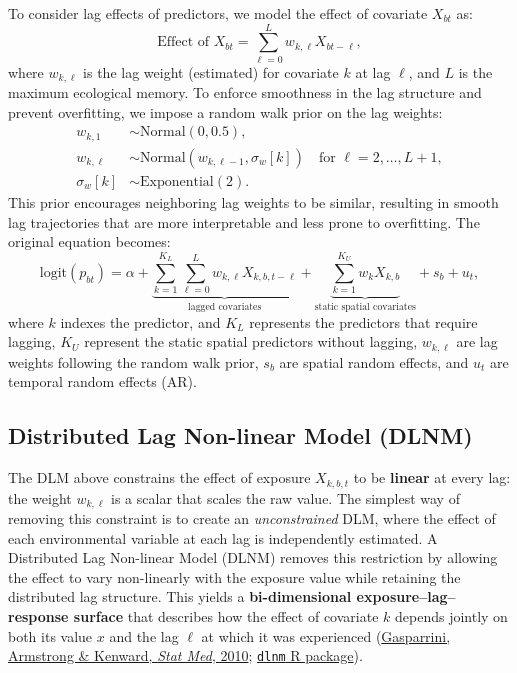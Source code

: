 \documentclass[12pt,a4paper]{article}
\begin{document}
To consider lag effects of predictors, we model the effect of covariate $X_{bt}$ as:
\begin{equation}
\text{Effect of } X_{bt} = \sum_{\ell=0}^{L} w_{k,\ell} X_{bt-\ell},
\end{equation}
where $w_{k,\ell}$ is the lag weight (estimated) for covariate $k$ at lag $\ell$, and $L$ is the maximum ecological memory. To enforce smoothness in the lag structure and prevent overfitting, we impose a random walk prior on the lag weights:
\begin{align}
w_{k,1} &\sim \text{Normal}(0, 0.5), \\
w_{k,\ell} &\sim \text{Normal}(w_{k,\ell-1}, \sigma_w[k]) \quad \text{for } \ell = 2, \ldots, L+1, \\
\sigma_w[k] &\sim \text{Exponential}(2).
\end{align}
This prior encourages neighboring lag weights to be similar, resulting in smooth lag trajectories that are more interpretable and less prone to overfitting. The original equation becomes:
\begin{equation}
\text{logit}(p_{bt}) = \alpha + \underbrace{\sum_{k=1}^{K_L} \sum_{\ell=0}^{L} w_{k,\ell} X_{k,b,t-\ell}}_{\text{lagged covariates}} +  \underbrace{\sum_{k=1}^{K_U} w_{k} X_{k,b}}_{\text{static spatial covariates}} + s_b + u_t,
\end{equation}
where $k$ indexes the predictor, and $K_L$ represents the predictors that require lagging, $K_U$ represent the static spatial predictors without lagging, $w_{k,\ell}$ are lag weights following the random walk prior, $s_b$ are spatial random effects, and $u_t$ are temporal random effects (AR).

\subsection{Distributed Lag Non-linear Model (DLNM)}

The DLM above constrains the effect of exposure $X_{k,b,t}$ to be \textbf{linear} at every lag: the weight $w_{k,\ell}$ is a scalar that scales the raw value. The simplest way of removing this constraint is to create an \textit{unconstrained} DLM, where the effect of each environmental variable at each lag is independently estimated. A Distributed Lag Non-linear Model (DLNM) removes this restriction by allowing the effect to vary non-linearly with the exposure value while retaining the distributed lag structure. This yields a \textbf{bi-dimensional exposure--lag--response surface} that describes how the effect of covariate $k$ depends jointly on both its value $x$ and the lag $\ell$ at which it was experienced (\href{https://pubmed.ncbi.nlm.nih.gov/20812303/}{Gasparrini, Armstrong \& Kenward, \textit{Stat Med}, 2010}; \href{http://www.ag-myresearch.com/package-dlnm.html}{\texttt{dlnm} R package}).
\end{document}
